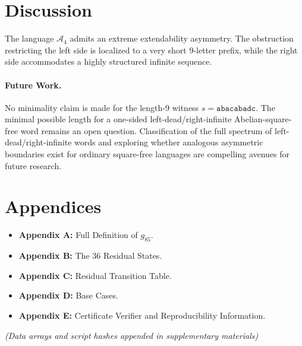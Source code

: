 \documentclass[12pt]{article}
\begin{document}
\section{Discussion}
The language $\mathcal{A}_4$ admits an extreme extendability asymmetry. The obstruction restricting the left side is localized to a very short 9-letter prefix, while the right side accommodates a highly structured infinite sequence.

\paragraph{Future Work.} 
No minimality claim is made for the length-9 witness $s = \texttt{abacabadc}$. The minimal possible length for a one-sided left-dead/right-infinite Abelian-square-free word remains an open question. Classification of the full spectrum of left-dead/right-infinite words and exploring whether analogous asymmetric boundaries exist for ordinary square-free languages are compelling avenues for future research.

\section*{Appendices}
\begin{itemize}
    \item \textbf{Appendix A:} Full Definition of $g_{85}$.
    \item \textbf{Appendix B:} The 36 Residual States.
    \item \textbf{Appendix C:} Residual Transition Table.
    \item \textbf{Appendix D:} Base Cases.
    \item \textbf{Appendix E:} Certificate Verifier and Reproducibility Information.
\end{itemize}
\textit{(Data arrays and script hashes appended in supplementary materials)}
\end{document}
